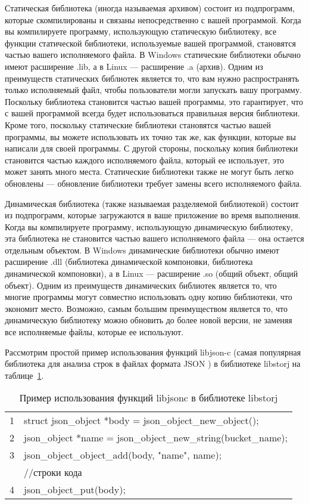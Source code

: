 Статическая библиотека (иногда называемая архивом) состоит из подпрограмм, которые скомпилированы и связаны непосредственно с вашей программой. Когда вы компилируете программу, использующую статическую библиотеку, все функции статической библиотеки, используемые вашей программой, становятся частью вашего исполняемого файла. В Windows статические библиотеки обычно имеют расширение .lib, а в Linux — расширение .a (архив). Одним из преимуществ статических библиотек является то, что вам нужно распространять только исполняемый файл, чтобы пользователи могли запускать вашу программу. Поскольку библиотека становится частью вашей программы, это гарантирует, что с вашей программой всегда будет использоваться правильная версия библиотеки. Кроме того, поскольку статические библиотеки становятся частью вашей программы, вы можете использовать их точно так же, как функции, которые вы написали для своей программы. С другой стороны, поскольку копия библиотеки становится частью каждого исполняемого файла, который ее использует, это может занять много места. Статические библиотеки также не могут быть легко обновлены — обновление библиотеки требует замены всего исполняемого файла.

Динамическая библиотека (также называемая разделяемой библиотекой) состоит из подпрограмм, которые загружаются в ваше приложение во время выполнения. Когда вы компилируете программу, использующую динамическую библиотеку, эта библиотека не становится частью вашего исполняемого файла — она остается отдельным объектом. В Windows динамические библиотеки обычно имеют расширение .dll (библиотека динамической компоновки, библиотека динамической компоновки), а в Linux — расширение .so (общий объект, общий объект). Одним из преимуществ динамических библиотек является то, что многие программы могут совместно использовать одну копию библиотеки, что экономит место. Возможно, самым большим преимуществом является то, что динамическую библиотеку можно обновить до более новой версии, не заменяя все исполняемые файлы, которые ее используют.

Рассмотрим простой пример использования функций libjson-c (самая популярная библиотека для анализа строк в файлах формата JSON ) в библиотеке libstorj на таблице~\cref{tab:exampleLibjson1}.

\begin{table}
    \centering
    \captionsetup{justification=centering}
    \caption{Пример использования функций libjson\-c в библиотеке libstorj}\label{tab:exampleLibjson1}
    \begin{tabular}{|c|l|}
        \hline
        {1} & {struct json\_object *body = json\_object\_new\_object();} \\
        {2} & {json\_object *name = json\_object\_new\_string(bucket\_name);} \\
        {3} & {json\_object\_object\_add(body, "name", name);} \\
        { } & {//строки кода} \\
        {4} & json\_object\_put(body); \\
        \hline
    \end{tabular}
\end{table}


